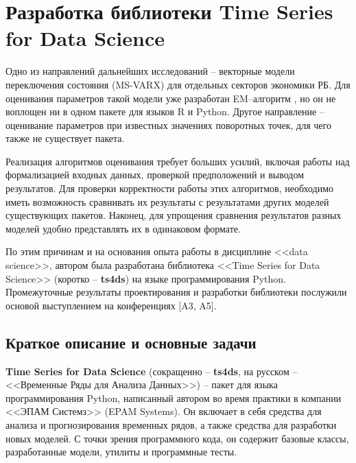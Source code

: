 \documentclass[a4paper,14pt]{extreport}
\begin{document}
	
	\chapter{Разработка библиотеки Time Series for Data Science}
	
	Одно из направлений дальнейших исследований – векторные модели переключения состояния (MS-VARX) для отдельных секторов экономики РБ. Для оценивания параметров такой модели уже разработан EM–алгоритм \cite{malNovopMSVARX}, но он не воплощен ни в одном пакете для языков R и Python. Другое направление – оценивание параметров при известных значениях поворотных точек, для чего также не существует пакета.
	
	Реализация алгоритмов оценивания требует больших усилий, включая работы над формализацией входных данных, проверкой предположений и выводом результатов. Для проверки корректности работы этих алгоритмов, необходимо иметь возможность сравнивать их результаты с результатами других моделей существующих пакетов. Наконец, для упрощения сравнения результатов разных моделей удобно представлять их в одинаковом формате.
	
	По этим причинам и на основания опыта работы в дисциплине <<data science>>, автором была разработана библиотека <<Time Series for Data Science>> (коротко – \textbf{ts4ds}) на языке программирования Python. Промежуточные результаты проектирования и разработки библиотеки послужили основой выступлением на конференциях [A3, A5].
	
	\section{Краткое описание и основные задачи}
	
	\textbf{Time Series for Data Science} (сокращенно – \textbf{ts4ds}, на русском – <<Временные Ряды для Анализа Данных>>) – пакет для языка программирования Python, написанный автором во время практики в компании <<ЭПАМ Системз>> (EPAM Systems). Он включает в себя средства для анализа и прогнозирования временных рядов, а также средства для разработки новых моделей. С точки зрения программного кода, он содержит базовые классы, разработанные модели, утилиты и программные тесты.
	
\end{document}
